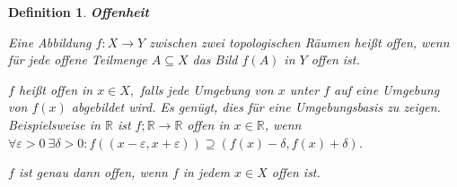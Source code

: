 \documentclass[12pt]{scrbook}   %
\newtheorem{definiX}[alles]{Definition}
\newenvironment{defini}[1]{\begin{definiX}{\bf #1}\par\rm}{\end{definiX}}
\begin{document}
\begin{defini} {Offenheit}
Eine Abbildung $f:X\longrightarrow Y$ zwischen zwei topologischen 
Räumen heißt {\it offen}, wenn für jede offene Teilmenge $A\subseteq X$
das Bild $f(A)$ in $Y$ offen ist.

$f$ heißt {\it offen in } $x\in X,$ falls jede Umgebung von $x$ unter $f$ 
auf eine Umgebung von $f(x)$ abgebildet wird. Es genügt, dies für eine Umgebungsbasis zu zeigen. Beispielsweise in $\mathbb R$ ist $f;\mathbb R\to \mathbb R$ offen in $x\in \mathbb R$, wenn $\forall \varepsilon >0 \ \exists \delta >0: f( (x-\varepsilon, x+\varepsilon) ) \supseteq (f(x)-\delta, f(x)+\delta)$.

$f$ ist genau dann offen, wenn $f$ in jedem $x\in X$ offen ist.

\end{defini}
\end{document}
